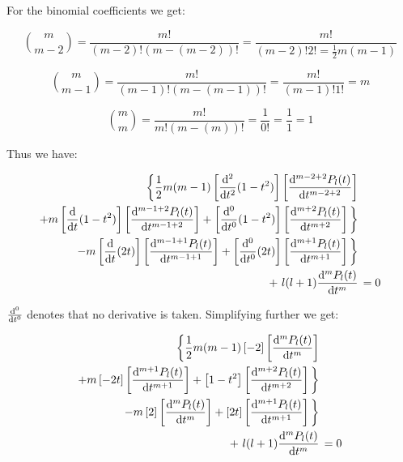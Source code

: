 \documentclass{article}
\begin{document}
    For the binomial coefficients we get:

    \begin{equation}
        \binom{m}{m - 2} = \frac{m!}{(m - 2)!(m - (m - 2))!} = \frac{m!}{(m - 2)!2! = \frac{1}{2}m(m - 1)}
    \end{equation}

    \begin{equation}
        \binom{m}{m - 1} = \frac{m!}{(m - 1)!(m - (m - 1))!} = \frac{m!}{(m - 1)!1!} = m
    \end{equation}

    \begin{equation}
        \binom{m}{m} = \frac{m!}{m!(m - (m))!} = \frac{1}{0!} = \frac{1}{1} = 1
    \end{equation}

    Thus we have:

    \begin{equation}
        \begin{aligned}
            \bigg\{\frac{1}{2}m(m - 1)\left[\odv[order = 2]{}{t}(1 - t^2)\right]\left[\odv[order = m - 2 + 2]{P_l(t)}{t}\right]& \\
                + m\left[\odv[order = 1]{}{t}(1 - t^2)\right]\left[\odv[order = m - 1 + 2]{P_l(t)}{t}\right]
            + \left[\odv[order = 0]{}{t}(1 - t^2)\right]\left[\odv[order = m + 2]{P_l(t)}{t}\right]\bigg\}& \\
            - m\left[\odv[order = 1]{}{t}(2t)\right]\left[\odv[order = m - 1 + 1]{P_l(t)}{t} \right]
            + \left[\odv[order = 0]{}{t}(2t)\right]\left[\odv[order = m + 1]{P_l(t)}{t} \right]\bigg\}& \\ 
            + \ l(l+1)\odv[order = m]{P_l(t)}{t} &\, = 0
        \end{aligned}
    \end{equation}

    $\odv[order = 0]{}{t}$ denotes that no derivative is taken. Simplifying further we get:

    \begin{equation}
        \begin{aligned}
            \bigg\{\frac{1}{2}m(m - 1)\left[-2\right]\left[\odv[order = m]{P_l(t)}{t}\right]& \\
                + m\left[-2t\right]\left[\odv[order = m + 1]{P_l(t)}{t}\right]
            + \left[1 - t^2\right]\left[\odv[order = m + 2]{P_l(t)}{t}\right]\bigg\}& \\
            - m\left[2\right]\left[\odv[order = m]{P_l(t)}{t} \right]
            + \left[2t\right]\left[\odv[order = m + 1]{P_l(t)}{t} \right]\bigg\}& \\ 
            + \ l(l+1)\odv[order = m]{P_l(t)}{t} &\, = 0
        \end{aligned}
    \end{equation}
\end{document}
